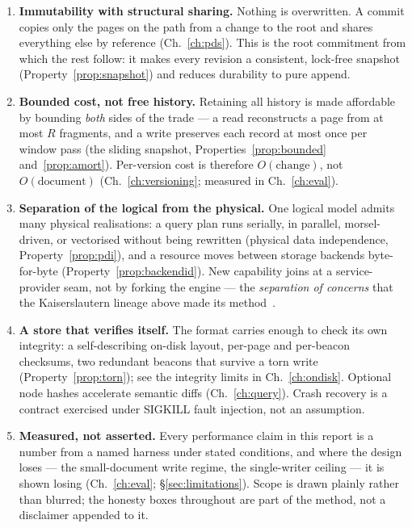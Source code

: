 \documentclass[11pt,a4paper,oneside]{report}
\theoremstyle{sirixthm}
\begin{document}
\begin{enumerate}[label=\textbf{P\arabic*.},leftmargin=2.6em]
\item \textbf{Immutability with structural sharing.} Nothing is overwritten. A commit copies only the
  pages on the path from a change to the root and shares everything else by reference (Ch.~\ref{ch:pds}).
  This is the root commitment from which the rest follow: it makes every revision a consistent, lock-free
  snapshot (Property~\ref{prop:snapshot}) and reduces durability to pure append.

\item \textbf{Bounded cost, not free history.} Retaining all history is made affordable by bounding
  \emph{both} sides of the trade --- a read reconstructs a page from at most $R$ fragments, and a write
  preserves each record at most once per window pass (the sliding snapshot, Properties~\ref{prop:bounded}
  and~\ref{prop:amort}). Per-version cost is therefore $O(\text{change})$, not $O(\text{document})$
  (Ch.~\ref{ch:versioning}; measured in Ch.~\ref{ch:eval}).

\item \textbf{Separation of the logical from the physical.} One logical model admits many physical
  realisations: a query plan runs serially, in parallel, morsel-driven, or vectorised without being
  rewritten (physical data independence, Property~\ref{prop:pdi}), and a resource moves between storage
  backends byte-for-byte (Property~\ref{prop:backendid}). New capability joins at a service-provider seam,
  not by forking the engine --- the \emph{separation of concerns} that the Kaiserslautern lineage above
  made its method~\cite{baechle}.

\item \textbf{A store that verifies itself.} The format carries enough to check its own integrity: a
  self-describing on-disk layout, per-page and per-beacon checksums, two redundant beacons that survive a
  torn write (Property~\ref{prop:torn}); see the integrity limits in Ch.~\ref{ch:ondisk}.
  Optional node hashes accelerate semantic diffs (Ch.~\ref{ch:query}). Crash recovery is a contract
  exercised under SIGKILL fault injection, not an assumption.

\item \textbf{Measured, not asserted.} Every performance claim in this report is a number from a named
  harness under stated conditions, and where the design loses --- the small-document write regime, the
  single-writer ceiling --- it is shown losing (Ch.~\ref{ch:eval}; \S\ref{sec:limitations}). Scope is
  drawn plainly rather than blurred; the honesty boxes throughout are part of the method, not a disclaimer
  appended to it.
\end{enumerate}
\end{document}

